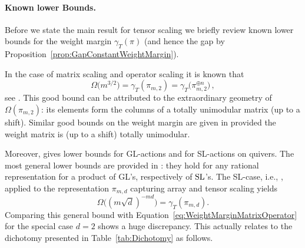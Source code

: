 \paragraph{Known lower Bounds.}

Before we state the main result for tensor scaling we briefly review known lower bounds for the weight margin $\gamma_T(\pi)$ (and hence the gap by Proposition~\ref{prop:GapConstantWeightMargin}).

In the case of matrix scaling and operator scaling it is known that
	\begin{equation} \label{eq:WeightMarginMatrixOperator}
		\Omega \big( m^{3/2} \big) = \gamma_T(\pi_{m,2}) = \gamma_T \big( \pi_{m,2}^{\oplus n} \big) \, ,
	\end{equation}
see \cite{linial2000deterministic, gurvits2004classical}. This good bound can be attributed to the extraordinary geometry of $\Omega(\pi_{m,2})$: its elements form the columns of a totally unimodular matrix (up to a shift). Similar good bounds on the weight margin are given in \cite[Corollaries~6.11 and 6.18]{GradflowArXiv} provided the weight matrix is (up to a shift) totally unimodular.

Moreover, \cite[Theorem~6.24]{GradflowArXiv} gives lower bounds for GL-actions and for SL-actions on quivers. The most general lower bounds are provided in \cite[Theorem~6.10]{GradflowArXiv}: they hold for any rational representation for a product of GL's, respectively of $\operatorname{SL}$'s. The SL-case, i.e., \cite[Theorem~6.10 Item~3]{GradflowArXiv}, applied to the representation $\pi_{m,d}$ capturing array and tensor scaling yields
	\begin{equation}\label{eq:WeightMarginTensor}
		\Omega \big( (m \sqrt{d})^{-md} \big) = \gamma_T(\pi_{m,d}) .
	\end{equation}
Comparing this general bound with Equation~\eqref{eq:WeightMarginMatrixOperator} for the special case $d=2$ shows a huge discrepancy. This actually relates to the dichotomy presented in Table~\ref{tab:Dichotomy} as follows.


